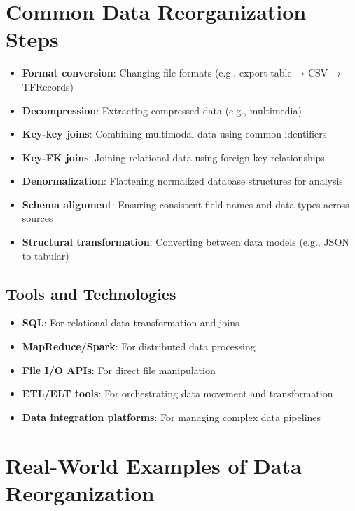\documentclass[12pt]{article}
\begin{document}
\section{Common Data Reorganization Steps}

\begin{tcolorbox}[colback=blue!5!white,colframe=blue!75!black,title={Common Reorganization Steps}]
\begin{itemize}
    \item \textbf{Format conversion}: Changing file formats (e.g., export table → CSV → TFRecords)
    \item \textbf{Decompression}: Extracting compressed data (e.g., multimedia)
    \item \textbf{Key-key joins}: Combining multimodal data using common identifiers
    \item \textbf{Key-FK joins}: Joining relational data using foreign key relationships
    \item \textbf{Denormalization}: Flattening normalized database structures for analysis
    \item \textbf{Schema alignment}: Ensuring consistent field names and data types across sources
    \item \textbf{Structural transformation}: Converting between data models (e.g., JSON to tabular)
\end{itemize}
\end{tcolorbox}

\subsection{Tools and Technologies}
\begin{itemize}
    \item \textbf{SQL}: For relational data transformation and joins
    \item \textbf{MapReduce/Spark}: For distributed data processing
    \item \textbf{File I/O APIs}: For direct file manipulation
    \item \textbf{ETL/ELT tools}: For orchestrating data movement and transformation
    \item \textbf{Data integration platforms}: For managing complex data pipelines
\end{itemize}

\section{Real-World Examples of Data Reorganization}
\end{document}
